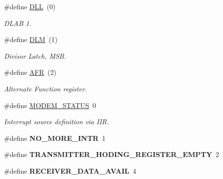 \begin{DoxyCompactItemize}
\#define \mbox{\hyperlink{group__i386__uart_ga4466639cd64ebf372a621168c5e25964}{D\+LL}}~(0)
\begin{DoxyCompactList}\small\item\em D\+L\+AB 1. \end{DoxyCompactList}\item 
\mbox{\label{group__i386__uart_ga3b48b12dc65f62dd40ab1163fe7997fb}} 
\#define \mbox{\hyperlink{group__i386__uart_ga3b48b12dc65f62dd40ab1163fe7997fb}{D\+LM}}~(1)
\begin{DoxyCompactList}\small\item\em Divisor Latch, M\+SB. \end{DoxyCompactList}\item 
\mbox{\label{group__i386__uart_gaff65acf29ca3219055658a5f9ea0a7de}} 
\#define \mbox{\hyperlink{group__i386__uart_gaff65acf29ca3219055658a5f9ea0a7de}{A\+FR}}~(2)
\begin{DoxyCompactList}\small\item\em Alternate Function register. \end{DoxyCompactList}\item 
\mbox{\label{group__i386__uart_ga6513628ede18301c0857892dab0ee4a9}} 
\#define \mbox{\hyperlink{group__i386__uart_ga6513628ede18301c0857892dab0ee4a9}{M\+O\+D\+E\+M\+\_\+\+S\+T\+A\+T\+US}}~0
\begin{DoxyCompactList}\small\item\em Interrupt source definition via I\+IR. \end{DoxyCompactList}\item 
\mbox{\label{group__i386__uart_ga9907ccf60e27bd3974d68b86cdfae490}} 
\#define {\bfseries N\+O\+\_\+\+M\+O\+R\+E\+\_\+\+I\+N\+TR}~1
\item 
\mbox{\label{group__i386__uart_ga9b83cbc1e17b98ad4b869f4d4c0bebe1}} 
\#define {\bfseries T\+R\+A\+N\+S\+M\+I\+T\+T\+E\+R\+\_\+\+H\+O\+D\+I\+N\+G\+\_\+\+R\+E\+G\+I\+S\+T\+E\+R\+\_\+\+E\+M\+P\+TY}~2
\item 
\mbox{\label{group__i386__uart_gad942cfb782f8e704106272b5d24371ee}} 
\#define {\bfseries R\+E\+C\+E\+I\+V\+E\+R\+\_\+\+D\+A\+T\+A\+\_\+\+A\+V\+A\+IL}~4
\item 

\end{DoxyCompactItemize}
